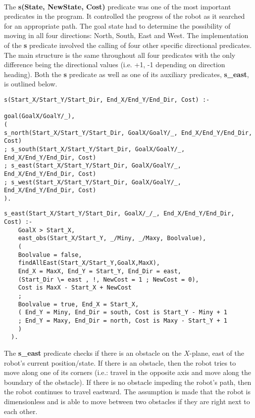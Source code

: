 \documentclass[11pt]{article}
\newcommand{\forceindent}{\leavevmode{\parindent=1em\indent}}
\begin{document}
\\
\forceindent The \textbf{s(State, NewState, Cost)} predicate was one of the most important predicates in the program. It controlled the progress of the robot as it searched for an appropriate path. The goal state had to determine the possibility of moving in all four directions: North, South, East and West. The implementation of the \textbf{s} predicate involved the calling of four other specific directional predicates. The main structure is the same throughout all four predicates with the only difference being the directional values (i.e. +1, -1 depending on direction heading). Both the \textbf{s} predicate as well as one of its auxiliary predicates, \textbf{s\_east}, is outlined below.

\begin{lstlisting} 
s(Start_X/Start_Y/Start_Dir, End_X/End_Y/End_Dir, Cost) :-

goal(GoalX/GoalY/_),
( 
s_north(Start_X/Start_Y/Start_Dir, GoalX/GoalY/_, End_X/End_Y/End_Dir, Cost)
; s_south(Start_X/Start_Y/Start_Dir, GoalX/GoalY/_, End_X/End_Y/End_Dir, Cost)		
; s_east(Start_X/Start_Y/Start_Dir, GoalX/GoalY/_, End_X/End_Y/End_Dir, Cost)
; s_west(Start_X/Start_Y/Start_Dir, GoalX/GoalY/_, End_X/End_Y/End_Dir, Cost)
).
\end{lstlisting}
\vspace{2 mm}
\begin{lstlisting}  
s_east(Start_X/Start_Y/Start_Dir, GoalX/_/_, End_X/End_Y/End_Dir, Cost) :-
	GoalX > Start_X,
	east_obs(Start_X/Start_Y, _/Miny, _/Maxy, Boolvalue),
	( 	
	Boolvalue = false,
	findAllEast(Start_X/Start_Y,GoalX,MaxX),
	End_X = MaxX, End_Y = Start_Y, End_Dir = east,
	(Start_Dir \= east , !, NewCost = 1 ; NewCost = 0),
	Cost is MaxX - Start_X + NewCost
	;
	Boolvalue = true, End_X = Start_X,
	( End_Y = Miny, End_Dir = south, Cost is Start_Y - Miny + 1
	; End_Y = Maxy, End_Dir = north, Cost is Maxy - Start_Y + 1
    )
  ).
\end{lstlisting}
\vspace{2 mm}
\forceindent The \textbf{s\_east} predicate checks if there is an obstacle on the $X$\nobreakdash-plane, east of the robot's current position/state. If there is an obstacle, then the robot tries to move along one of its corners (i.e.: travel in the opposite axis and move along the boundary of the obstacle). If there is no obstacle impeding the robot's path, then the robot continues to travel eastward. The assumption is made that the robot is dimensionless and is able to move between two obstacles if they are right next to each other. \\
\end{document}
